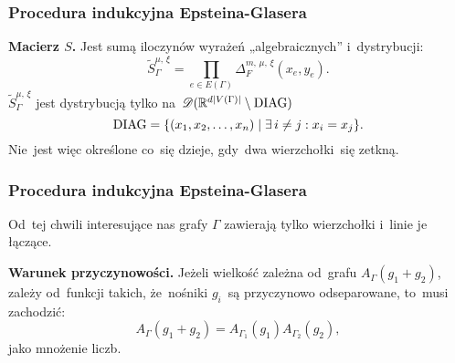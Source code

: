 \documentclass[10pt,t]{beamer}
\begin{document}
\begin{frame}
  \frametitle{Procedura indukcyjna Epsteina-Glasera}


  \textbf{Macierz $S$.}
  Jest sumą iloczynów wyrażeń „algebraicznych” i~dystrybucji:
  \begin{equation}
    \label{eq:Epstein-Glaser-21}
    \widetilde{S}_{ \Gamma }^{ \mu,\, \xi } =
    \prod\limits_{ e \in E( \Gamma ) } \Delta_{ F }^{ m,\, \mu,\, \xi }( x_{ e }, y_{ e } ).
  \end{equation}
  $\widetilde{S}_{ \Gamma }^{ \mu,\, \xi }$ jest dystrybucją tylko
  na~$\mathcal{D}( \mathbb{R}^{ d | V( \Gamma ) | } \setminus \textrm{DIAG} )$
  \begin{equation}
    \label{eq:Epstein-Glaser-22}
    \textrm{DIAG} =
    \{ ( x_{ 1 }, x_{ 2 }, \ldots, x_{ n } ) \; | \; \exists\, i \neq j : x_{ i } = x_{ j } \}.
  \end{equation}
  Nie~jest więc określone co~się dzieje, gdy~dwa wierzchołki~się
  zetkną.

\end{frame}





\begin{frame}
  \frametitle{Procedura indukcyjna Epsteina-Glasera}


  Od~tej chwili interesujące nas grafy $\Gamma$ zawierają tylko wierzchołki
  i~linie je łączące.

  \textbf{Warunek przyczynowości.}
  Jeżeli wielkość zależna od~grafu
  $A_{ \Gamma }( g _{ 1 } + g_{ 2 } )$, zależy od~funkcji takich,
  że~nośniki $g_{ i }$~są przyczynowo odseparowane, to~musi zachodzić:
  \begin{equation}
    \label{eq:Epstein-Glaser-23}
    A_{ \Gamma }( g _{ 1 } + g_{ 2 } ) =
    A_{ \Gamma_{ 1 } }( g _{ 1 } ) A_{ \Gamma_{ 2 } }( g_{ 2 } ),
  \end{equation}
  jako mnożenie liczb.

\end{frame}
\end{document}
